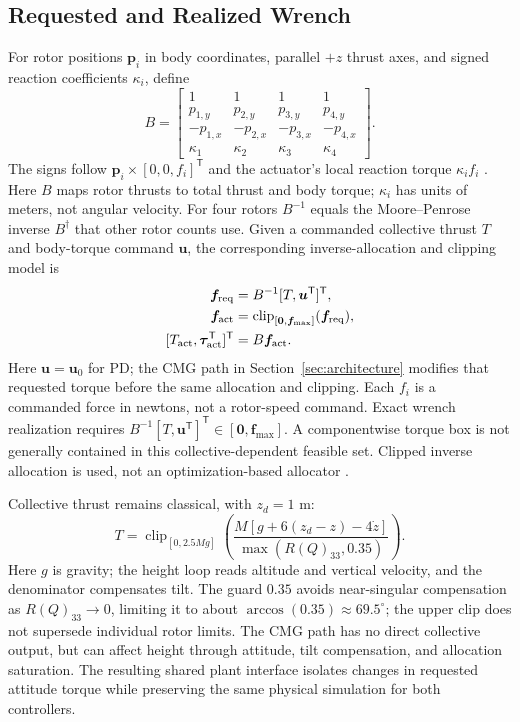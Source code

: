\documentclass[letterpaper, 10 pt, conference]{ieeeconf}
\newcommand{\T}{^{\mathsf T}}
\newcommand{\clip}{\operatorname{clip}}
\begin{document}
\subsection{Requested and Realized Wrench}
For rotor positions $\bm p_i$ in body coordinates, parallel $+z$ thrust
axes, and signed reaction coefficients $\kappa_i$, define
\begin{equation}
 B=\begin{bmatrix}
 1&1&1&1\\p_{1,y}&p_{2,y}&p_{3,y}&p_{4,y}\\
 -p_{1,x}&-p_{2,x}&-p_{3,x}&-p_{4,x}\\
 \kappa_1&\kappa_2&\kappa_3&\kappa_4
 \end{bmatrix}.
 \label{eq:allocationmatrix}
\end{equation}
The signs follow $\bm p_i\times[0,0,f_i]\T$ and the actuator's local reaction torque $\kappa_i f_i$ \cite{garciacarrillo2013quad}. Here $B$ maps rotor thrusts to total thrust and body torque; $\kappa_i$ has units of meters, not angular velocity. For four rotors $B^{-1}$ equals the Moore--Penrose inverse $B^\dagger$ that other rotor counts use. Given a commanded collective thrust $T$ and body-torque command $\bm u$, the corresponding inverse-allocation and clipping model is
\begin{equation}
 \begin{aligned}
 \bm f_{\rm req}&=B^{-1}[T,\bm u\T]\T,\\
 \bm f_{\rm act}&=\clip_{[\bm0,\bm f_{\max}]}(\bm f_{\rm req}),\\
 [T_{\rm act},\bm\tau_{\rm act}\T]\T&=B\bm f_{\rm act}.
 \end{aligned}
 \label{eq:mixer}
\end{equation}
Here $\bm u=\bm u_0$ for PD; the CMG path in Section~\ref{sec:architecture}
modifies that requested torque before the same allocation and clipping.
Each $f_i$ is a commanded force in newtons, not a rotor-speed command.
Exact wrench realization requires
$B^{-1}[T,\bm u\T]\T\in[\bm0,\bm f_{\max}]$.
A componentwise torque box is not generally contained in this
collective-dependent feasible set. Clipped inverse allocation is used,
not an optimization-based allocator \cite{monteiro2016allocation}.

Collective thrust remains classical, with $z_d=1$ m:
\begin{equation}
 T=\clip_{[0,2.5Mg]}
 \left(\frac{M[g+6(z_d-z)-4\dot z]}{\max(R(Q)_{33},0.35)}\right).
 \label{eq:collective}
\end{equation}
Here $g$ is gravity; the height loop reads altitude and vertical velocity,
and the denominator compensates tilt. The guard $0.35$ avoids near-singular
compensation as $R(Q)_{33}\to0$, limiting it to about
$\arccos(0.35)\approx69.5^\circ$; the upper clip does not supersede
individual rotor limits. The CMG path has no direct collective
output, but can affect height through attitude, tilt compensation, and
allocation saturation.
The resulting shared plant interface isolates changes in requested
attitude torque while preserving the same physical simulation for both
controllers.
\end{document}
